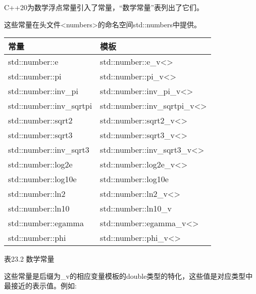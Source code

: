 C++20为数学浮点常量引入了常量，“数学常量”表列出了它们。

这些常量在头文件<numbers>的命名空间std::numbers中提供。

\begin{longtable}[c]{|l|l|}
\hline
\textbf{常量}        & \textbf{模板}                                    \\ \hline
\endfirsthead
%
\endhead
%
std::number::e           & std::number::e\_v\textless{}\textgreater{}           \\ \hline
std::number::pi          & std::number::pi\_v\textless{}\textgreater{}          \\ \hline
std::number::inv\_pi     & std::number::inv\_pi\_v\textless{}\textgreater{}     \\ \hline
std::number::inv\_sqrtpi & std::number::inv\_sqrtpi\_v\textless{}\textgreater{} \\ \hline
std::number::sqrt2       & std::number::sqrt2\_v\textless{}\textgreater{}       \\ \hline
std::number::sqrt3       & std::number::sqrt3\_v\textless{}\textgreater{}       \\ \hline
std::number::inv\_sqrt3  & std::number::inv\_sqrt3\_v\textless{}\textgreater{}  \\ \hline
std::number::log2e       & std::number::log2e\_v\textless{}\textgreater{}       \\ \hline
std::number::log10e      & std::number::log10e                                  \\ \hline
std::number::ln2         & std::number::ln2\_v\textless{}\textgreater{}         \\ \hline
std::number::ln10        & std::number::ln10\_v                                 \\ \hline
std::number::egamma      & std::number::egamma\_v\textless{}\textgreater{}      \\ \hline
std::number::phi         & std::number::phi\_v\textless{}\textgreater{}         \\ \hline
\end{longtable}

\begin{center}
表23.2 数学常量
\end{center}

这些常量是后缀为\_v的相应变量模板的double类型的特化，这些值是对应类型中最接近的表示值。例如:

